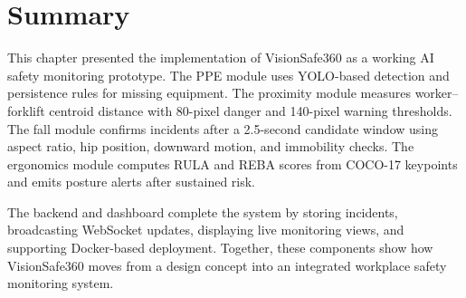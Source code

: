 \section{Summary}

This chapter presented the implementation of VisionSafe360 as a working AI safety monitoring prototype. The PPE module uses YOLO-based detection and persistence rules for missing equipment. The proximity module measures worker--forklift centroid distance with 80-pixel danger and 140-pixel warning thresholds. The fall module confirms incidents after a 2.5-second candidate window using aspect ratio, hip position, downward motion, and immobility checks. The ergonomics module computes RULA and REBA scores from COCO-17 keypoints and emits posture alerts after sustained risk.

The backend and dashboard complete the system by storing incidents, broadcasting WebSocket updates, displaying live monitoring views, and supporting Docker-based deployment. Together, these components show how VisionSafe360 moves from a design concept into an integrated workplace safety monitoring system.
